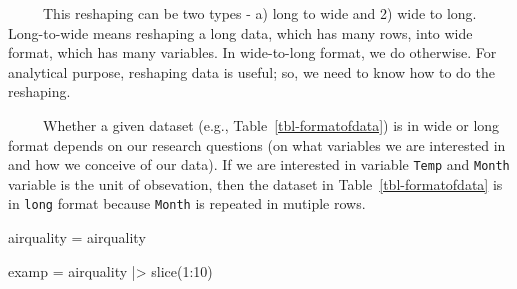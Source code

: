 \documentclass[
  letterpaper,
  DIV=11,
  numbers=noendperiod]{scrreprt}
\newenvironment{Shaded}{\begin{snugshade}}{\end{snugshade}}
\newcommand{\DecValTok}[1]{\textcolor[rgb]{0.68,0.00,0.00}{#1}}
\newcommand{\FunctionTok}[1]{\textcolor[rgb]{0.28,0.35,0.67}{#1}}
\newcommand{\NormalTok}[1]{\textcolor[rgb]{0.00,0.23,0.31}{#1}}
\newcommand{\OtherTok}[1]{\textcolor[rgb]{0.00,0.23,0.31}{#1}}
\newcommand{\SpecialCharTok}[1]{\textcolor[rgb]{0.37,0.37,0.37}{#1}}
\begin{document}
~~~~~This reshaping can be two types - a) long to wide and 2) wide to
long. Long-to-wide means reshaping a long data, which has many rows,
into wide format, which has many variables. In wide-to-long format, we
do otherwise. For analytical purpose, reshaping data is useful; so, we
need to know how to do the reshaping.

~~~~~Whether a given dataset (e.g., Table~\ref{tbl-formatofdata}) is in
wide or long format depends on our research questions (on what variables
we are interested in and how we conceive of our data). If we are
interested in variable \texttt{Temp} and \texttt{Month} variable is the
unit of obsevation, then the dataset in Table~\ref{tbl-formatofdata} is
in \texttt{long} format because \texttt{Month} is repeated in mutiple
rows.

\begin{Shaded}
\begin{Highlighting}[]
\NormalTok{airquality }\OtherTok{=}\NormalTok{ airquality}

\NormalTok{examp }\OtherTok{=}\NormalTok{ airquality }\SpecialCharTok{|\textgreater{}}
    \FunctionTok{slice}\NormalTok{(}\DecValTok{1}\SpecialCharTok{:}\DecValTok{10}\NormalTok{)}
\end{Highlighting}
\end{Shaded}
\end{document}
